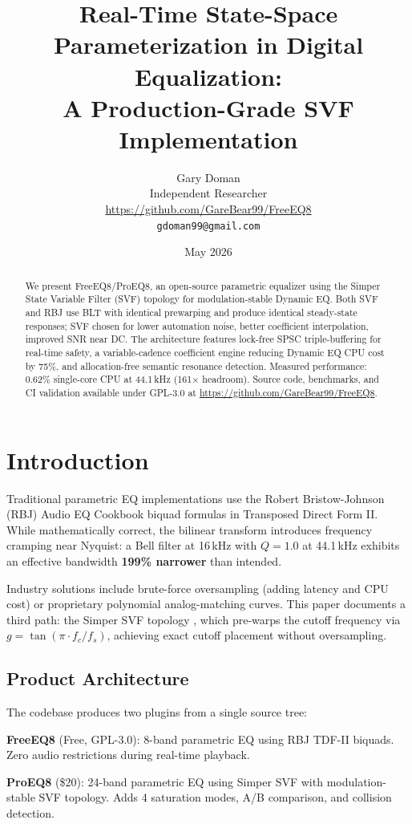 \documentclass[11pt,a4paper]{article}
\title{Real-Time State-Space Parameterization in Digital Equalization:\\A Production-Grade SVF Implementation}
\author{Gary Doman\\
Independent Researcher\\
\url{https://github.com/GareBear99/FreeEQ8}\\
\texttt{gdoman99@gmail.com}}
\date{May 2026}
\begin{document}
\maketitle

\begin{abstract}
We present FreeEQ8/ProEQ8, an open-source parametric equalizer using the Simper State Variable Filter (SVF) topology for modulation-stable Dynamic EQ. Both SVF and RBJ use BLT with identical prewarping and produce identical steady-state responses; SVF chosen for lower automation noise, better coefficient interpolation, improved SNR near DC. The architecture features lock-free SPSC triple-buffering for real-time safety, a variable-cadence coefficient engine reducing Dynamic EQ CPU cost by 75\%, and allocation-free semantic resonance detection. Measured performance: 0.62\% single-core CPU at 44.1\,kHz (161$\times$ headroom). Source code, benchmarks, and CI validation available under GPL-3.0 at \url{https://github.com/GareBear99/FreeEQ8}.
\end{abstract}

\section{Introduction}
Traditional parametric EQ implementations use the Robert Bristow-Johnson (RBJ) Audio EQ Cookbook biquad formulas \cite{rbj} in Transposed Direct Form II. While mathematically correct, the bilinear transform introduces frequency cramping near Nyquist: a Bell filter at 16\,kHz with $Q=1.0$ at 44.1\,kHz exhibits an effective bandwidth \textbf{199\% narrower} than intended.

Industry solutions include brute-force oversampling (adding latency and CPU cost) or proprietary polynomial analog-matching curves. This paper documents a third path: the Simper SVF topology \cite{simper}, which pre-warps the cutoff frequency via $g = \tan(\pi \cdot f_c / f_s)$, achieving exact cutoff placement without oversampling.

\subsection{Product Architecture}
The codebase produces two plugins from a single source tree:

\textbf{FreeEQ8} (Free, GPL-3.0): 8-band parametric EQ using RBJ TDF-II biquads. Zero audio restrictions during real-time playback.

\textbf{ProEQ8} (\$20): 24-band parametric EQ using Simper SVF with modulation-stable SVF topology. Adds 4 saturation modes, A/B comparison, and collision detection.
\end{document}
